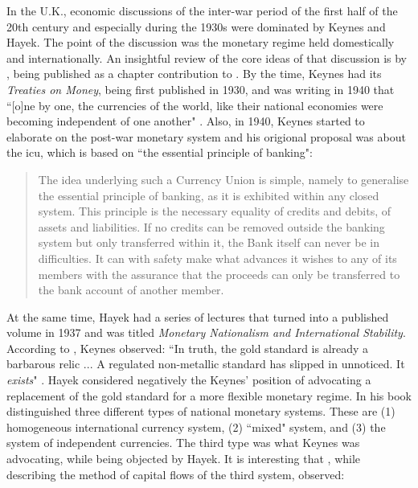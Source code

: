 In the U.K., economic discussions of the inter-war period of the first half of the 20th century and especially during the 1930s were dominated by Keynes and Hayek. The point of the discussion was the monetary regime held domestically and internationally. An insightful review of the core ideas of that discussion is by \cite{kregel1986}, being published as a chapter contribution to \cite{drukker}. By the time, Keynes had its \textit{Treaties on Money}, being first published in 1930, and was writing in 1940 that ``[o]ne by one, the currencies of the world, like their national economies were becoming independent of one another" \citep[p.~3]{keynes1980_25}. Also, in 1940, Keynes started to elaborate on the post-war monetary system and his origional proposal was about the \ac{icu}, which is based on ``the essential principle of banking":

\begin{quote}
The idea underlying such a Currency Union is simple, namely to generalise the essential principle of banking, as it is exhibited within any closed system. This principle is the necessary equality of credits and debits, of assets and liabilities. If no credits can be removed outside the banking system but only transferred within it, the Bank itself can never be in difficulties. It can with safety make what advances it wishes to any of its members with the assurance that the proceeds can only be transferred to the bank account of another member.
\citep[p.~3]{keynes1980_25}
\end{quote}

At the same time, Hayek had a series of lectures that turned into a published volume in 1937 and was titled \textit{Monetary Nationalism and International Stability}. According to \citeauthor{kregel1986}, Keynes observed: ``In truth, the gold standard is already a barbarous relic ... A regulated non-metallic standard has slipped in unnoticed. It \textit{exists}" \citeauthor[p.~34, emphasis original]{kregel1986}.
Hayek considered negatively the Keynes' position of advocating a replacement of the gold standard for a more flexible monetary regime.
In his book \citeauthor{hayek1937} distinguished three different types of national monetary systems.
These are (1) homogeneous international currency system, (2) ``mixed" system, and (3) the system of independent currencies.  The third type was what Keynes was advocating, while being objected by Hayek. It is interesting that \citeauthor{hayek1937}, while describing the method of capital flows of the third system, observed: 

